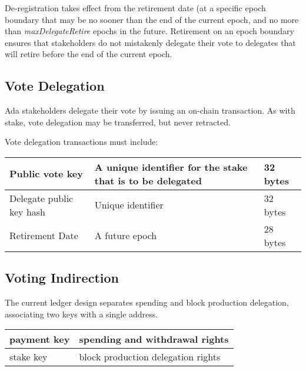 De-registration takes effect from the retirement date (at a specific epoch boundary that may be no sooner than the end of the current epoch, and no more than \emph{maxDelegateRetire} epochs in the future.  Retirement on an epoch boundary ensures that stakeholders do not mistakenly delegate their vote to delegates that will retire before the end of the current epoch.

\subsection{Vote Delegation}

Ada stakeholders delegate their vote by issuing an on-chain transaction.  As with stake, vote delegation may be transferred, but never retracted.

Vote delegation transactions must include:

\begin{tabular}{||l|p{3in}|l||}
  \hline\hline
  Public vote key & A unique identifier for the stake that is to be delegated  & 32 bytes
  \\\hline
  Delegate public key hash & Unique identifier & 32 bytes
  \\\hline
  Retirement Date & A future epoch & 28 bytes
  \\\hline
  \hline
\end{tabular}
\subsection{Voting Indirection}

The current ledger design separates spending and block production delegation, associating two keys with a single address.

\begin{center}
  \begin{tabular}{||l|l||}
\hline\hline
  payment key & spending and withdrawal rights \\\hline
  stake key & block production delegation rights \\\hline
  \hline\hline
  \end{tabular}
\end{center}

